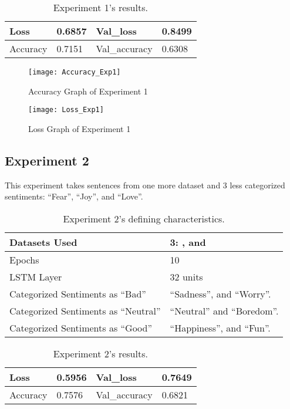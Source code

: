 \begin{table}[!bh]
	\caption{Experiment 1's results.}
	\vspace{0.5cm}
	\centering
	\begin{tabular}[t]{|l|l|l|l|}
	\hline
		Loss & 0.6857 & Val\_loss & 0.8499
	\\ \hline
		Accuracy & 0.7151 & Val\_accuracy & 0.6308
	\\ \hline
	\end{tabular}
\end{table}


\begin{figure}[!h]
	\centering
	\texttt{[image: Accuracy\_Exp1]}
	\caption{Accuracy Graph of Experiment 1}
	\label{fig:accuracy_exp1}
	\texttt{[image: Loss\_Exp1]}
	\caption{Loss Graph of Experiment 1}
	\label{fig:loss_exp1}
\end{figure}
\pagebreak

\subsection{Experiment 2}
This experiment takes sentences from one more dataset and 3 less categorized sentiments: ``Fear'', ``Joy'', and ``Love''.
\begin{table}[!th]
	\caption{Experiment 2's defining characteristics.}
	\vspace{0.5cm}
	\centering
	\begin{tabular}[t]{|l|l|}
	\hline
		Datasets Used & \makecell{3: \citet{d1}, \citet{d2} and\\ \citet{d3}}
	\\ \hline
		Epochs & 10
	\\ \hline
		LSTM Layer & 32 units
	\\ \hline
		Categorized Sentiments as ``Bad'' & ``Sadness'', and ``Worry''.
	\\ \hline	
		 Categorized Sentiments as ``Neutral'' & ``Neutral'' and ``Boredom''.
	\\ \hline	
		Categorized Sentiments as ``Good'' & ``Happiness'', and ``Fun''.
	\\ \hline
	\end{tabular}
\end{table}

\begin{table}[!bh]
	\caption{Experiment 2's results.}
	\vspace{0.5cm}
	\centering
	\begin{tabular}[t]{|l|l|l|l|}
	\hline
		Loss & 0.5956 & Val\_loss & 0.7649
	\\ \hline
		Accuracy & 0.7576 & Val\_accuracy & 0.6821
	\\ \hline
	\end{tabular}
\end{table}


